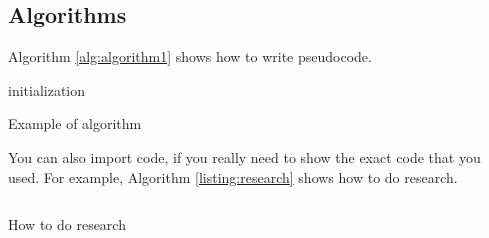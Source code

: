 \subsection{Algorithms}

Algorithm \ref{alg:algorithm1} shows how to write pseudocode.

\begin{algorithm}
 initialization\;
 \caption{Example of algorithm}
 \label{alg:algorithm1}
\end{algorithm}

You can also import code, if you really need to show the exact code that you used. For example, Algorithm \ref{listing:research} shows how to do research.

\begin{center}
\begin{listing}[H]
\centering
\inputminted{python}{codes/research.py}
\caption{How to do research}
\label{listing:research}
\end{listing}
\end{center}
